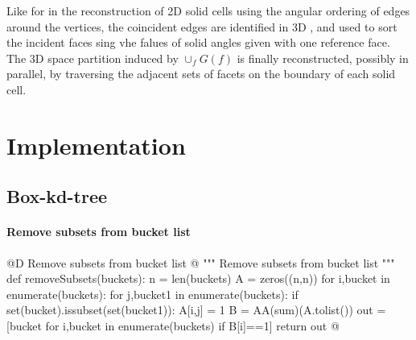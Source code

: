 \documentclass[11pt,oneside]{article}    %
\begin{document}
Like for in the reconstruction of 2D solid cells using the angular ordering of edges around the vertices, the coincident edges are identified in 3D , and used to sort the incident faces sing vhe falues of solid angles given with one reference face.
The 3D space partition induced by $\cup_f G(f)$ is finally reconstructed, possibly in parallel, by traversing the adjacent sets of facets on the boundary of each solid cell.



\section{Implementation}

\subsection{Box-kd-tree}


\paragraph{Remove subsets from bucket list}
@D Remove subsets from bucket list @{
""" Remove subsets from bucket list """
def removeSubsets(buckets):
    n = len(buckets)
    A = zeros((n,n))
    for i,bucket in enumerate(buckets):
        for j,bucket1 in enumerate(buckets):
            if set(bucket).issubset(set(bucket1)):
                A[i,j] = 1
    B = AA(sum)(A.tolist())
    out = [bucket for i,bucket in enumerate(buckets) if B[i]==1]
    return out
@}
    
\end{document}
